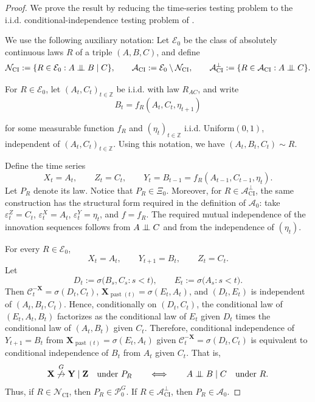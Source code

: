 \documentclass[a4paper,11pt]{article}
\newcommand{\indep}{\perp\kern-5.5pt\perp}
\newcommand{\toverset}[2]{\overset{{\rm #1}}{#2}}
\DeclareMathOperator{\past}{past}
\begin{document}
\begin{proof}
We prove the result by reducing the time-series testing problem to the
i.i.d. conditional-independence testing problem of
\citet{HARDNESS_OF_CONDITIONAL_TESTING}.

We use the following auxiliary notation: Let \(\mathcal E_0\) be the
class of absolutely continuous laws \(R\) of a triple \((A,B,C)\), and define
\[
    \mathcal N_{\mathrm{CI}}
    :=
    \{R\in\mathcal E_0:A\indep B\mid C\},
    \qquad
    \mathcal A_{\mathrm{CI}}
    :=
    \mathcal E_0\setminus\mathcal N_{\mathrm{CI}} ,
\qquad
    \mathcal A_{\mathrm{CI}}^{\perp}
    :=
    \{R\in\mathcal A_{\mathrm{CI}}: A\indep C\}.
\]

For \(R\in\mathcal E_0\), let \((A_t,C_t)_{t\in\mathbb Z}\) be i.i.d. with
law \(R_{AC}\), and write 
\[
    B_t=f_R(A_t,C_t,\eta_{t+1})
\]

for some measurable function \(f_R\) and \((\eta_t)_{t\in\mathbb Z}\)  i.i.d.
Uniform\((0,1)\), independent of \((A_t,C_t)_{t\in\mathbb Z}\). Using this notation, we have \((A_t,B_t,C_t)\sim R\). 

Define the time series
\[
    X_t=A_t,
    \qquad
    Z_t=C_t,
    \qquad
    Y_t=B_{t-1}=f_R(A_{t-1},C_{t-1},\eta_t).
\]
Let \(P_R\) denote its law. Notice that \(P_R\in\Xi_0\). Moreover,
for \(R\in\mathcal A_{\mathrm{CI}}^{\perp}\), the same construction has the
structural form required in the definition of \(\mathcal A_0\): take
\(\varepsilon_t^Z=C_t\), \(\varepsilon_t^X=A_t\),
\(\varepsilon_t^Y=\eta_t\), and \(f=f_R\). The required mutual independence of
the innovation sequences follows from \(A\indep C\) and from the independence
of \((\eta_t)\).

For every \(R\in\mathcal E_0\),
\[
    X_t=A_t,
    \qquad
    Y_{t+1}=B_t,
    \qquad
    Z_t=C_t .
\]
Let
\[
    D_t:=\sigma\big(B_{s},C_s:s<t\big),
    \qquad
    E_t:=\sigma\big(A_s:s<t\big).
\]
Then \(\mathcal C_t^{-\mathbf X}=\sigma(D_t,C_t)\),
\(\mathbf X_{\past(t)}=\sigma(E_t,A_t)\), and \((D_t,E_t)\) is independent of
\((A_t,B_t,C_t)\). Hence, conditionally on \((D_t,C_t)\), the conditional law
of \((E_t,A_t,B_t)\) factorizes as the conditional law of \(E_t\) given
\(D_t\) times the conditional law of \((A_t,B_t)\) given \(C_t\). Therefore,
conditional independence of \(Y_{t+1}=B_t\) from
\(\mathbf X_{\past(t)}=\sigma(E_t,A_t)\) given
\(\mathcal C_t^{-\mathbf X}=\sigma(D_t,C_t)\) is equivalent to conditional
independence of \(B_t\) from \(A_t\) given \(C_t\). That is,
\[
    \mathbf X\toverset{G}{\not\to}\mathbf Y\mid\mathbf Z
    \quad\text{under }P_R
    \qquad\Longleftrightarrow\qquad
    A\indep B\mid C
    \quad\text{under }R .
\]
Thus, if \(R\in\mathcal N_{\mathrm{CI}}\), then
\(P_R\in\mathcal P_0^G\). If \(R\in\mathcal A_{\mathrm{CI}}^{\perp}\), then
\(P_R\in\mathcal A_0\).


\end{proof}
\end{document}
